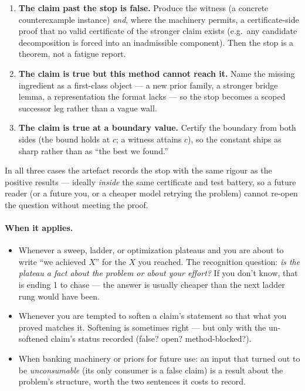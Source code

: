 \begin{enumerate}
\item \textbf{The claim past the stop is false.} Produce the witness (a
  concrete counterexample instance) \emph{and}, where the machinery
  permits, a certificate-side proof that no valid certificate of the
  stronger claim exists (e.g.\ any candidate decomposition is forced
  into an inadmissible component). Then the stop is a theorem, not a
  fatigue report.
\item \textbf{The claim is true but this method cannot reach it.} Name
  the missing ingredient as a first-class object --- a new prior
  family, a stronger bridge lemma, a representation the format lacks
  --- so the stop becomes a scoped successor leg rather than a vague
  wall.
\item \textbf{The claim is true at a boundary value.} Certify the
  boundary from both sides (the bound holds at $c$; a witness attains
  $c$), so the constant ships as sharp rather than as ``the best we
  found.''
\end{enumerate}

In all three cases the artefact records the stop with the same rigour as
the positive results --- ideally \emph{inside} the same certificate and
test battery, so a future reader (or a future you, or a cheaper model
retrying the problem) cannot re-open the question without meeting the
proof.

\paragraph{When it applies.}
\begin{itemize}
\item Whenever a sweep, ladder, or optimization plateaus and you are
  about to write ``we achieved $X$'' for the $X$ you reached. The
  recognition question: \emph{is the plateau a fact about the problem
  or about your effort?} If you don't know, that is ending 1 to chase
  --- the answer is usually cheaper than the next ladder rung would
  have been.
\item Whenever you are tempted to soften a claim's statement so that
  what you proved matches it. Softening is sometimes right --- but only
  with the un-softened claim's status recorded (false? open?
  method-blocked?).
\item When banking machinery or priors for future use: an input that
  turned out to be \emph{unconsumable} (its only consumer is a false
  claim) is a result about the problem's structure, worth the two
  sentences it costs to record.
\end{itemize}

